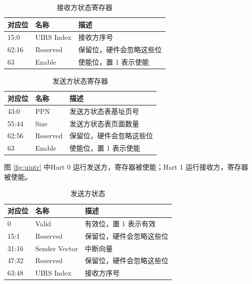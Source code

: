 \begin{table}
    \centering
    \begin{threeparttable}[c]
        \begin{tabular}{|l|l|l|}
            \hline
            对应位 & 名称 & 描述 \\
            \hline
            15:0 & UIRS Index & 接收方序号 \\
            \hline
            62:16 & Reserved & 保留位，硬件会忽略这些位 \\
            \hline
            63 & Enable & 使能位，置 1 表示使能 \\
            \hline
        \end{tabular}
        \caption{接收方状态寄存器}
        \label{tab:suirs}
    \end{threeparttable}
\end{table}

\begin{table}
    \centering
    \begin{threeparttable}[c]
        \begin{tabular}{|l|l|l|}
            \hline
            对应位 & 名称 & 描述 \\
            \hline
            43:0 & PPN & 发送方状态表基址页号 \\
            \hline
            55:44 & Size & 发送方状态表页面数量 \\
            \hline
            62:56 & Reserved & 保留位，硬件会忽略这些位 \\
            \hline
            63 & Enable & 使能位，置 1 表示使能 \\
            \hline
        \end{tabular}
        \caption{发送方状态寄存器}
        \label{tab:suist}
    \end{threeparttable}
\end{table}

图 \ref{fig:uintr} 中Hart 0 运行发送方，\Rsuist 寄存器被使能；Hart 1 运行接收方，\Rsuirs 寄存器被使能。

\begin{table}
    \centering
    \begin{threeparttable}[c]
        \begin{tabular}{|l|l|l|}
            \hline
            对应位 & 名称 & 描述 \\
            \hline
            0 & Valid & 有效位，置 1 表示有效 \\
            \hline
            15:1 & Reserved & 保留位，硬件会忽略这些位 \\
            \hline
            31:16 & Sender Vector & 中断向量 \\
            \hline
            47:32 & Reserved & 保留位，硬件会忽略这些位 \\
            \hline
            63:48 & UIRS Index & 接收方序号 \\
            \hline
        \end{tabular}
        \caption{发送方状态}
        \label{tab:uiss}
    \end{threeparttable}
\end{table}

